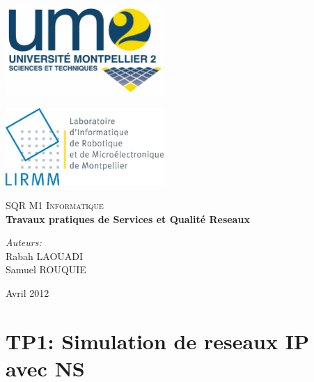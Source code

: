 \documentclass[a4paper]{report}
\theoremstyle{definition}
\begin{document}
\normalsize
{}


\begin{titlepage}

\begin{minipage}[c][4cm][t]{7.8cm}
\raggedright 
\includegraphics[width=6cm]{./logo_um2}
\end{minipage}
\begin{minipage}[c][4cm][t]{7.8cm}
\raggedleft
\includegraphics[width=6cm]{./LogoLIRMM}
\end{minipage}

\vfill

\begin{center}
\textsc{\Large SQR M1 Informatique}\\[0.5cm]

\hspace{0.4cm}
{ \huge \bfseries Travaux pratiques de Services et Qualité Reseaux}\\[3cm]

\begin{minipage}[c][4cm][t]{0.4\textwidth}
\raggedright \large
\emph{Auteurs:}\\
Rabah LAOUADI\\
Samuel ROUQUIE
\end{minipage}

\vfill
{\large  Avril 2012}
\end{center}
\end{titlepage}

\chapter*{TP1: Simulation de reseaux IP avec NS}
\end{document}

